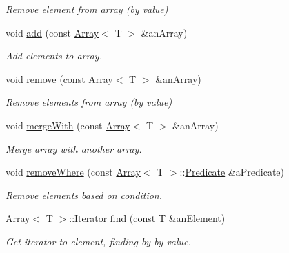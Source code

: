 \begin{DoxyCompactItemize}
\begin{DoxyCompactList}\small\item\em Remove element from array (by value) \end{DoxyCompactList}\item 
void \hyperlink{classlibrary_1_1core_1_1ctnr_1_1_array_a8dd701c76ba2659ee2e438cff70fa971}{add} (const \hyperlink{classlibrary_1_1core_1_1ctnr_1_1_array}{Array}$<$ T $>$ \&an\+Array)
\begin{DoxyCompactList}\small\item\em Add elements to array. \end{DoxyCompactList}\item 
void \hyperlink{classlibrary_1_1core_1_1ctnr_1_1_array_ab37ca6fc14eefd1336544e05ba1b4d0e}{remove} (const \hyperlink{classlibrary_1_1core_1_1ctnr_1_1_array}{Array}$<$ T $>$ \&an\+Array)
\begin{DoxyCompactList}\small\item\em Remove elements from array (by value) \end{DoxyCompactList}\item 
void \hyperlink{classlibrary_1_1core_1_1ctnr_1_1_array_abe72cec38e65761df3eaddcfa9b7a44a}{merge\+With} (const \hyperlink{classlibrary_1_1core_1_1ctnr_1_1_array}{Array}$<$ T $>$ \&an\+Array)
\begin{DoxyCompactList}\small\item\em Merge array with another array. \end{DoxyCompactList}\item 
void \hyperlink{classlibrary_1_1core_1_1ctnr_1_1_array_a322b1bfc3a93ea18bf68eb0cff69e6d3}{remove\+Where} (const \hyperlink{classlibrary_1_1core_1_1ctnr_1_1_array}{Array}$<$ T $>$\+::\hyperlink{classlibrary_1_1core_1_1ctnr_1_1_array_a74cd325a740870aea490b6b739aa06ae}{Predicate} \&a\+Predicate)
\begin{DoxyCompactList}\small\item\em Remove elements based on condition. \end{DoxyCompactList}\item 
\hyperlink{classlibrary_1_1core_1_1ctnr_1_1_array}{Array}$<$ T $>$\+::\hyperlink{classlibrary_1_1core_1_1ctnr_1_1_array_a2364a34e7bc76d3661c3d89c4729a0e4}{Iterator} \hyperlink{classlibrary_1_1core_1_1ctnr_1_1_array_afece85f642e3c623bac197e25ad2d4ec}{find} (const T \&an\+Element)
\begin{DoxyCompactList}\small\item\em Get iterator to element, finding by by value. \end{DoxyCompactList}\end{DoxyCompactItemize}
